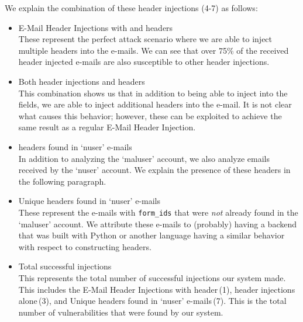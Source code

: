 
We explain the combination of these header injections (4-7) as follows:
\begin{itemize}
	\item E-Mail Header Injections with  and  headers\\
	These represent the perfect attack scenario where we are able to inject multiple headers into the e-mails. We can see that over 75\% of the received  header injected e-mails are also susceptible to other header injections.
	
	\item Both  header injections and  headers \\
	This combination shows us that in addition to being able to inject into the  fields, we are able to inject additional headers into the e-mail. It is not clear what causes this behavior; however, these can be exploited to achieve the same result as a regular E-Mail Header Injection.
	
	\item {} headers found in `nuser' e-mails\\
	In addition to analyzing the `maluser' account, we also analyze emails received by the `nuser' account. We explain the presence of these headers in the following paragraph.

	\item Unique  headers found in `nuser' e-mails\\
	These represent the e-mails with \lstinline|form_ids| that were \emph{not} already found in the `maluser' account. We attribute these e-mails to (probably) having a backend that was built with Python or another language having a similar behavior with respect to constructing headers.
	
	\item Total successful injections\\
	This represents the total number of successful injections our system made. This includes the E-Mail Header Injections with  header\,(1),  header injections alone\,(3), and Unique  headers found in `nuser' e-mails\,(7). This is the total number of vulnerabilities that were found by our system.
	
\end{itemize}
